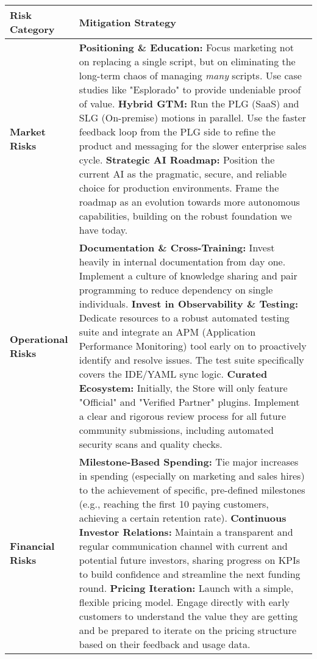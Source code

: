 \begin{table}[H]
\centering
\begin{tabularx}{\textwidth}{@{}lL@{}}
\toprule
\textbf{Risk Category} & \textbf{Mitigation Strategy} \\
\midrule
\textbf{Market Risks} & 
\textbf{Positioning \& Education:} Focus marketing not on replacing a single script, but on eliminating the long-term chaos of managing \textit{many} scripts. Use case studies like "Esplorado" to provide undeniable proof of value. \newline\newline
\textbf{Hybrid GTM:} Run the PLG (SaaS) and SLG (On-premise) motions in parallel. Use the faster feedback loop from the PLG side to refine the product and messaging for the slower enterprise sales cycle. \newline\newline
\textbf{Strategic AI Roadmap:} Position the current AI as the pragmatic, secure, and reliable choice for production environments. Frame the roadmap as an evolution towards more autonomous capabilities, building on the robust foundation we have today. \\
\addlinespace
\textbf{Operational Risks} & 
\textbf{Documentation \& Cross-Training:} Invest heavily in internal documentation from day one. Implement a culture of knowledge sharing and pair programming to reduce dependency on single individuals. \newline\newline
\textbf{Invest in Observability \& Testing:} Dedicate resources to a robust automated testing suite and integrate an APM (Application Performance Monitoring) tool early on to proactively identify and resolve issues. The test suite specifically covers the IDE/YAML sync logic. \newline\newline
\textbf{Curated Ecosystem:} Initially, the Store will only feature "Official" and "Verified Partner" plugins. Implement a clear and rigorous review process for all future community submissions, including automated security scans and quality checks. \\
\addlinespace
\textbf{Financial Risks} & 
\textbf{Milestone-Based Spending:} Tie major increases in spending (especially on marketing and sales hires) to the achievement of specific, pre-defined milestones (e.g., reaching the first 10 paying customers, achieving a certain retention rate). \newline\newline
\textbf{Continuous Investor Relations:} Maintain a transparent and regular communication channel with current and potential future investors, sharing progress on KPIs to build confidence and streamline the next funding round. \newline\newline
\textbf{Pricing Iteration:} Launch with a simple, flexible pricing model. Engage directly with early customers to understand the value they are getting and be prepared to iterate on the pricing structure based on their feedback and usage data. \\
\bottomrule
\end{tabularx}
\end{table}

